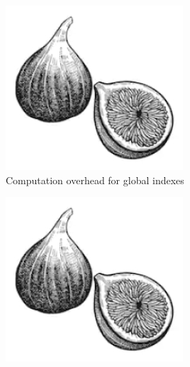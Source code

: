 \documentclass[lettersize,journal]{IEEEtran} %
\begin{document}
\begin{figure}[!t]
    \medskip
  
    \begin{subfigure}{0.3\columnwidth}
      \includegraphics[width=\linewidth]{fig1.png}
      \caption{Computation overhead for global indexes}
      \label{fig:subfig4}
    \end{subfigure}
    \hfill
    \begin{subfigure}{0.3\columnwidth}
      \includegraphics[width=\linewidth]{fig1.png}

\end{subfigure}
\end{figure}
\end{document}

